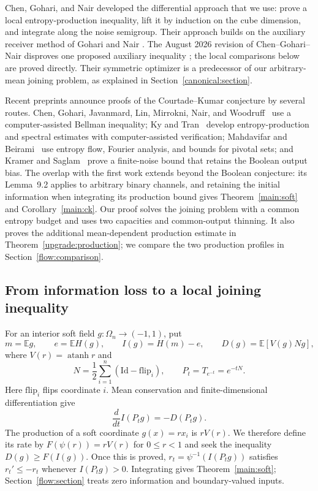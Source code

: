 \documentclass[11pt]{article}
\theoremstyle{definition}
\theoremstyle{remark}
\newcommand{\E}{\mathbb E}
\numberwithin{equation}{section}
\begin{document}
Chen, Gohari, and Nair \cite{ChenGohariNair2025} developed the
differential approach that we use: prove a local entropy-production
inequality, lift it by induction on the cube dimension, and integrate
along the noise semigroup. Their approach builds on the auxiliary
receiver method of Gohari and Nair \cite{GohariNair2022}. The
August 2026 revision of Chen--Gohari--Nair disproves one proposed auxiliary inequality
\cite[Appendix~B]{ChenGohariNair2025}; the local comparisons below
are proved directly. Their symmetric optimizer is a predecessor of
our arbitrary-mean joining problem, as explained in
Section~\ref{canonical:section}.

Recent preprints announce proofs of the Courtade--Kumar conjecture by
several routes. Chen, Gohari, Javanmard, Lin, Mirrokni, Nair, and
Woodruff~\cite{ChenEtAl2026CK} use a computer-assisted Bellman inequality;
Ky and Tran~\cite{KyTran2026CK} develop entropy-production and spectral
estimates with computer-assisted verification;
Mahdavifar and Beirami~\cite{MahdavifarBeirami2026CK} use
entropy flow, Fourier analysis, and bounds for pivotal sets; and
Kramer and Saglam~\cite{KramerSaglam2026} prove a finite-noise
bound that retains the Boolean output bias.
The overlap with the first work extends beyond the Boolean conjecture:
its Lemma~9.2 applies to arbitrary binary channels, and retaining the
initial information when integrating its production bound gives
Theorem~\ref{main:soft} and Corollary~\ref{main:ck}.
Our proof solves the joining problem with a common entropy budget and
uses two capacities and common-output thinning. It also proves the additional
mean-dependent production estimate in
Theorem~\ref{upgrade:production}; we compare the two production
profiles in Section~\ref{flow:comparison}.

\subsection{From information loss to a local joining inequality}

For an interior soft field $g:\Omega_n\to(-1,1)$, put
\begin{equation}
 m=\E g,\qquad e=\E H(g),\qquad I(g)=H(m)-e,
 \qquad D(g)=\E[V(g)Ng],
 \label{main:functionals}
\end{equation}
where $V(r)=\operatorname{atanh}r$ and
\[
 N=\frac12\sum_{i=1}^n(\mathrm{Id}-\mathrm{flip}_i),
 \qquad P_t=T_{e^{-t}}=e^{-tN}.
\]
Here $\mathrm{flip}_i$ flips coordinate $i$. Mean conservation and
finite-dimensional differentiation give
\begin{equation}
 \frac{d}{dt}I(P_tg)=-D(P_tg).
 \label{main:flow-identity}
\end{equation}
The production of a soft coordinate $g(x)=r x_i$ is $rV(r)$.
We therefore define its rate by
$F(\psi(r))=rV(r)$ for $0\le r<1$ and seek the inequality
$D(g)\ge F(I(g))$. Once this is proved,
$r_t=\psi^{-1}(I(P_tg))$ satisfies $r_t'\le-r_t$ whenever
$I(P_tg)>0$. Integrating gives Theorem~\ref{main:soft};
Section~\ref{flow:section} treats zero information and boundary-valued
inputs.
\end{document}
